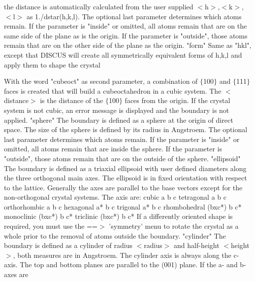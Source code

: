        the distance is automatically calculated from the user supplied 
       $ <$h$> $,$ <$k$> $,$ <$l$> $ as 1./dstar(h,k,l). 
       The optional last parameter determines which atoms remain. 
       If the parameter is "inside" or omitted, all atoms remain that 
       are on the same side of the plane as is the origin. 
       If the parameter is "outside", those atoms remain that are on 
       the other side of the plane as the origin. 
"form" Same as "hkl", except that DISCUS will create all symmetrically 
       equivalent forms of h,k,l and apply them to shape the crystal 
\par
       With the word "cubeoct" as second parameter, a combination of 
       $ \{$100$\} $ and $ \{$111$\} $ faces is created that will build a cubeoctahedron 
       in a cubic system. The $ <$distance$> $ is the distance of the $ \{$100$\} $ 
       faces from the origin. 
       If the crystal system is not cubic, an error message is 
       displayed and the boundary is not applied. 
"sphere" The boundary is defined as a sphere at the origin of direct 
       space. The size of the sphere is defined by its radius in Angstroem. 
       The optional last parameter determines which atoms remain. 
       If the parameter is "inside" or omitted, all atoms remain that 
       are inside the sphere. 
       If the parameter is "outside", those atoms remain that are on 
       the outside of the sphere. 
"ellipsoid" The boundary is defined as a triaxial ellipsoid with user 
       defined diameters along the three orthogonal main axes. 
       The ellipsoid is in fixed orientation with respect to the lattice. 
       Generally the axes are parallel to the base vectors except for the 
       non-orthogonal crystal systems. The axis are: 
       cubic           a       b      c 
       tetragonal      a       b      c 
       orthorhombic    a       b      c 
       hexagonal       a*      b      c 
       trigonal        a*      b      c 
       rhombohedral   (bxc*)   b      c* 
       monoclinic     (bxc*)   b      c* 
       triclinic      (bxc*)   b      c* 
       If a differently oriented shape is required, you must use the 
       ==$> $ 'symmetry' menu to rotate the crystal as a whole prior to 
       the removal of atoms outside the boundary. 
"cylinder"  The boundary is defined as a cylinder of radius $ <$radius$> $ 
       and half-height $ <$height$> $, both measures are in Angstroem. The 
       cylinder axis is always along the c-axis. The top and bottom 
       planes are parallel to the (001) plane. If the a- and b-axes are 
